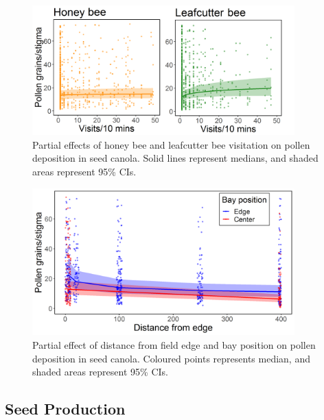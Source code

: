 \documentclass[12pt, draft]{article} %
\begin{document}
\begin{figure}
    \centering
    \includegraphics[width=0.9\textwidth,keepaspectratio=true]{slopeVisPol_both.png}
    \caption[Partial effects of honey bee and leafcutter bee visitation on pollen deposition in seed canola]{Partial effects of honey bee and leafcutter bee visitation on pollen deposition in seed canola. Solid lines represent medians, and shaded areas represent 95\% CIs.}
    \label{fig:visPol_both}
\end{figure}

\begin{figure} 
    \centering
    \includegraphics[width=0.9\textwidth,keepaspectratio=true]{slopeDistCentPol.png}
    \caption[Partial effect of distance from field edge and bay position on pollen deposition in seed canola]{Partial effect of distance from field edge and bay position on pollen deposition in seed canola. Coloured points represents median, and shaded areas represent 95\% CIs.}
    \label{fig:distCentPol}
\end{figure}

\subsection{Seed Production}
\end{document}
